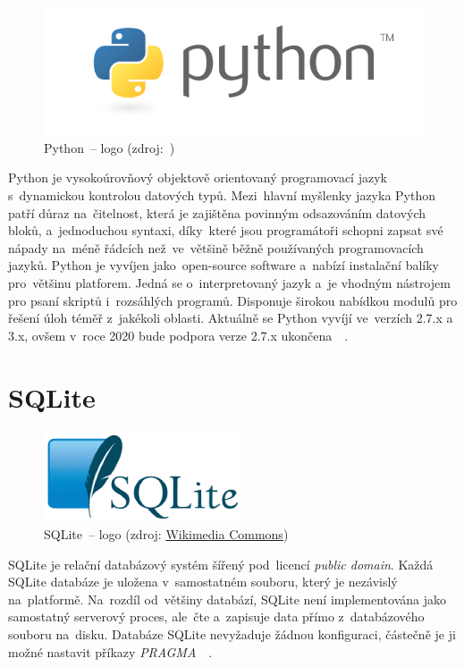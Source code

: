 	\begin{figure}[H] \centering
		\includegraphics[width=.5\textwidth]{./pictures/python_logo.png}
      	\caption[Python~– logo]{Python~– logo (zdroj:~\citep{python})}
		\label{fig:python_logo}
 	\end{figure}

Python je vysokoúrovňový objektově orientovaný programovací jazyk
s~dynamickou kontrolou datových typů. Mezi~hlavní myšlenky jazyka
Python patří důraz na~čitelnost, která je zajištěna povinným
odsazováním datových bloků, a~jednoduchou syntaxi, díky~které jsou
programátoři schopni zapsat své nápady na~méně řádcích než~ve~většině
běžně používaných programovacích jazyků. Python je vyvíjen
jako~open-source software a~nabízí instalační balíky pro~většinu
platforem. Jedná se o~interpretovaný jazyk a~je vhodným nástrojem pro
psaní skriptů i~rozsáhlých programů. Disponuje širokou nabídkou modulů
pro řešení úloh téměř z~jakékoli oblasti. Aktuálně se Python vyvíjí
ve~verzích 2.7.x a 3.x, ovšem v~roce 2020 bude podpora verze 2.7.x
ukončena~\citep{python}~\citep{wiki_python}.

\section{SQLite}
\label{sqlite}

	\begin{figure}[H] \centering
		\includegraphics[width=.2\textwidth]{./pictures/sqlite_logo.png}
      	\caption[SQLite~– logo]{SQLite~– logo (zdroj:
\href{https://commons.wikimedia.org/wiki/File:SQLite_Logo_4.png}{Wikimedia
Commons})}
		\label{fig:sqlite_logo}
 	\end{figure}

SQLite je relační databázový systém šířený pod~licencí \textit{public
domain}. Každá SQLite databáze je uložena v~samostatném souboru, který
je nezávislý na~platformě. Na~rozdíl od~většiny databází, SQLite není
implementována jako samostatný serverový proces, ale~čte a~zapisuje
data přímo z~databázového souboru na~disku. Databáze SQLite nevyžaduje
žádnou konfiguraci, částečně je ji možné nastavit příkazy
\textit{PRAGMA}~\citep{sqlite}~\citep{wiki_sqlite}.

